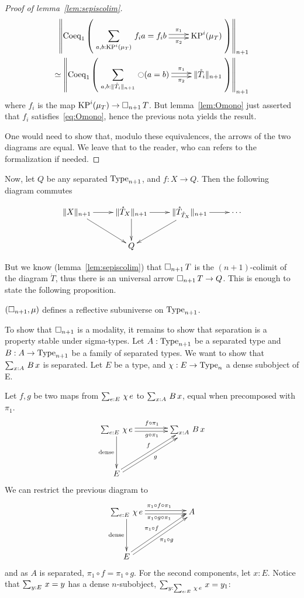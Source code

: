 \begin{proof}[Proof of lemma~\ref{lem:sepiscolim}]
  \[
    \begin{split}
    \left\|\mathrm{Coeq}_1 \left( 
      \xymatrix{
        \displaystyle{\sumD {a,b}{\KP^i(\mu_T)} {f_{i} a = f_{i} b}} \ar@<-.5ex>[r]_-{\pi_2} \ar@<.5ex>[r]^-{\pi_1} & \KP^i(\mu_T)
      }
    \right)\right\|_{n+1}
    \\ \simeq 
    \left\|\mathrm{Coeq}_1 \left( 
      \xymatrix{\displaystyle{\sumD {a,b} {\|\mathring T_i\|_{n+1}} {\modal (a=b)}} \ar@<-.5ex>[r]_-{\pi_2} \ar@<.5ex>[r]^-{\pi_1} & \|\mathring T_i\|_{n+1}}
    \right)\right\|_{n+1}
    \end{split}
  \]
  where $f_{i}$ is the map $\operatorname{KP}^i(\mu_T) \to \mathop{\square_{n+1}} T$. But
  lemma~\ref{lem:Omono} just asserted that $f_i$
  satisfies~\ref{eq:Omono}, hence the previous nota yields the result.
  
  One would need to show that, modulo these equivalences, the arrows
  of the two diagrams are equal. We leave that to the reader, who can
  refers to the formalization if needed.
\end{proof}

Now, let $Q$ be any separated $\operatorname{Type}_{n+1}$, and $f:X \to Q$. Then the
following diagram commutes

\[\xymatrix{
\|X\|_{n+1} \ar[r] \ar[rd] & \|\mathring T_{X}\|_{n+1} \ar[r] \ar[d] & \|\mathring
  T_{\mathring T_X} \|_{n+1} \ar[ld] \ar[r] & \cdots \\
  & Q &&
} \]%

But we know (lemma~\ref{lem:sepiscolim}) that $\mathop{\square_{n+1}} T$ is the
$(n+1)$-colimit of the diagram $\mathring T$, thus there is an universal
arrow $\mathop{\square_{n+1}} T \to Q$.
%
This is enough to state the following proposition.
\begin{prop}\label{prop:sep-subu}
  $(\mathop{\square_{n+1}},\mu)$ defines a reflective subuniverse on $\operatorname{Type}_{n+1}$.
\end{prop}

To show that $\mathop{\square_{n+1}}$ is a modality, it remains to show that
separation is a property stable under sigma-types.
%
Let $A:\operatorname{Type}_{n+1}$ be a separated type and $B:A \to \operatorname{Type}_{n+1}$ be a
family of separated types. We want to show that $\sum_{x:A}\, B\, x$ is separated. Let $E$
be a type, and $\chi:E\to\operatorname{Type}_n$ a dense subobject of E.

Let $f,g$ be two maps from $\sum_{e:E}\, \chi\,e$ to $\sum_{x:A}\, B\, x$, equal when precomposed with $\pi_1$.
\[\xymatrix @R=4em @C=4em{
  \sumD e E {\chi\, e} \ar@<-2pt>[r]_{g\circ\pi_1}
  \ar@<2pt>[r]^{f\circ \pi_1} \ar[d]_{\mathrm{dense}}& \sumD x A {B\, x} \\
  E \ar@<-2pt>[ru]_{g} \ar@<2pt>[ru]^{f}&
}\]%
We can restrict the previous diagram to 
\[\xymatrix @R=4em @C=5em{
  \sumD e E {\chi\, e} \ar@<-2pt>[r]_{\pi_1\circ g\circ\pi_1} \ar@<2pt>[r]^{\pi_1\circ f\circ \pi_1} \ar[d]_{\mathrm{dense}}& A \\
  E \ar@<-2pt>[ru]_{\pi_1\circ g} \ar@<2pt>[ru]^{\pi_1\circ f}&
}\]%
and as $A$ is separated, $\pi_1\circ f = \pi_1 \circ g$.
For the second components, let $x:E$. Notice that 
$\sum_{y:E}\, x = y$ has a dense $n$-subobject, $\sum_{y:\sum_{e:E}\, \chi\,
  e}\, x=y_1$:

